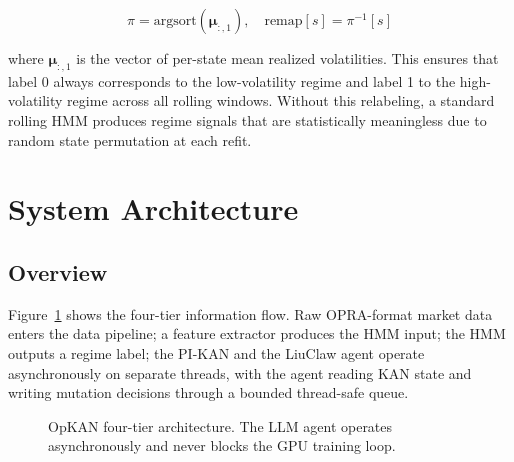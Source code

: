 \documentclass[11pt,a4paper]{article}
\begin{document}
\begin{equation}
\pi = \text{argsort}\left(\bm{\mu}_{:,1}\right), \quad \text{remap}[s] = \pi^{-1}[s]
\label{eq:hmm_relabel}
\end{equation}

where $\bm{\mu}_{:,1}$ is the vector of per-state mean realized volatilities. This ensures that label 0 always corresponds to the low-volatility regime and label 1 to the high-volatility regime across all rolling windows. Without this relabeling, a standard rolling HMM produces regime signals that are statistically meaningless due to random state permutation at each refit.

\section{System Architecture}
\label{sec:arch}

\subsection{Overview}

Figure~\ref{fig:architecture} shows the four-tier information flow. Raw OPRA-format market data enters the data pipeline; a feature extractor produces the HMM input; the HMM outputs a regime label; the PI-KAN and the LiuClaw agent operate asynchronously on separate threads, with the agent reading KAN state and writing mutation decisions through a bounded thread-safe queue.

\begin{figure}[h]
\centering
{}
\caption{OpKAN four-tier architecture. The LLM agent operates asynchronously and never blocks the GPU training loop.}
\label{fig:architecture}
\end{figure}
\end{document}
